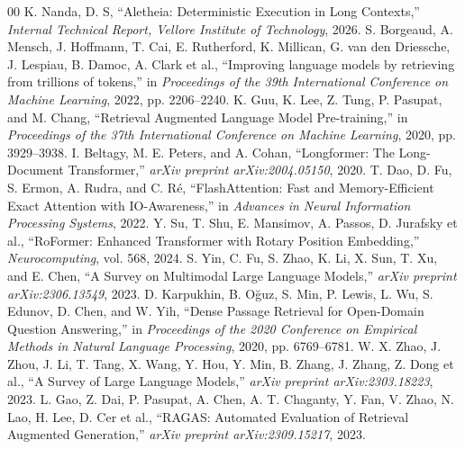 \documentclass[journal,10pt]{IEEEtran}
\begin{document}
\begin{thebibliography}{00}
 K. Nanda, D. S, ``Aletheia: Deterministic Execution in Long Contexts,'' \textit{Internal Technical Report, Vellore Institute of Technology}, 2026.
 S. Borgeaud, A. Mensch, J. Hoffmann, T. Cai, E. Rutherford, K. Millican, G. van den Driessche, J. Lespiau, B. Damoc, A. Clark et al., ``Improving language models by retrieving from trillions of tokens,'' in \textit{Proceedings of the 39th International Conference on Machine Learning}, 2022, pp. 2206--2240.
 K. Guu, K. Lee, Z. Tung, P. Pasupat, and M. Chang, ``Retrieval Augmented Language Model Pre-training,'' in \textit{Proceedings of the 37th International Conference on Machine Learning}, 2020, pp. 3929--3938.
 I. Beltagy, M. E. Peters, and A. Cohan, ``Longformer: The Long-Document Transformer,'' \textit{arXiv preprint arXiv:2004.05150}, 2020.
 T. Dao, D. Fu, S. Ermon, A. Rudra, and C. R\'{e}, ``FlashAttention: Fast and Memory-Efficient Exact Attention with IO-Awareness,'' in \textit{Advances in Neural Information Processing Systems}, 2022.
 Y. Su, T. Shu, E. Mansimov, A. Passos, D. Jurafsky et al., ``RoFormer: Enhanced Transformer with Rotary Position Embedding,'' \textit{Neurocomputing}, vol. 568, 2024.
 S. Yin, C. Fu, S. Zhao, K. Li, X. Sun, T. Xu, and E. Chen, ``A Survey on Multimodal Large Language Models,'' \textit{arXiv preprint arXiv:2306.13549}, 2023.
 D. Karpukhin, B. O\u{g}uz, S. Min, P. Lewis, L. Wu, S. Edunov, D. Chen, and W. Yih, ``Dense Passage Retrieval for Open-Domain Question Answering,'' in \textit{Proceedings of the 2020 Conference on Empirical Methods in Natural Language Processing}, 2020, pp. 6769--6781.
 W. X. Zhao, J. Zhou, J. Li, T. Tang, X. Wang, Y. Hou, Y. Min, B. Zhang, J. Zhang, Z. Dong et al., ``A Survey of Large Language Models,'' \textit{arXiv preprint arXiv:2303.18223}, 2023.
 L. Gao, Z. Dai, P. Pasupat, A. Chen, A. T. Chaganty, Y. Fan, V. Zhao, N. Lao, H. Lee, D. Cer et al., ``RAGAS: Automated Evaluation of Retrieval Augmented Generation,'' \textit{arXiv preprint arXiv:2309.15217}, 2023.
\end{thebibliography}
\end{document}
